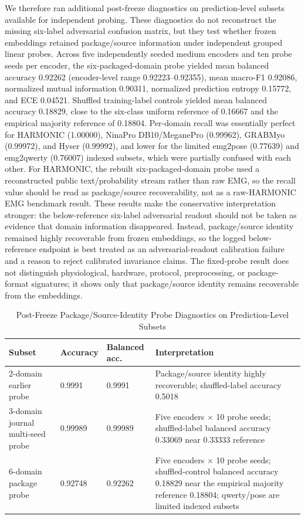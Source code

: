 \documentclass[journal]{IEEEtran}
\begin{document}
We therefore ran additional post-freeze diagnostics on prediction-level subsets available for independent probing. These diagnostics do not reconstruct the missing six-label adversarial confusion matrix, but they test whether frozen embeddings retained package/source information under independent grouped linear probes. Across five independently seeded medium encoders and ten probe seeds per encoder, the six-packaged-domain probe yielded mean balanced accuracy 0.92262 (encoder-level range 0.92223--0.92355), mean macro-F1 0.92086, normalized mutual information 0.90311, normalized prediction entropy 0.15772, and ECE 0.04521. Shuffled training-label controls yielded mean balanced accuracy 0.18829, close to the six-class uniform reference of 0.16667 and the empirical majority reference of 0.18804. Per-domain recall was essentially perfect for HARMONIC (1.00000), NinaPro DB10/MeganePro (0.99962), GRABMyo (0.99972), and Hyser (0.99992), and lower for the limited emg2pose (0.77639) and emg2qwerty (0.76007) indexed subsets, which were partially confused with each other. For HARMONIC, the rebuilt six-packaged-domain probe used a reconstructed public text/probability stream rather than raw EMG, so the recall value should be read as package/source recoverability, not as a raw-HARMONIC EMG benchmark result. These results make the conservative interpretation stronger: the below-reference six-label adversarial readout should not be taken as evidence that domain information disappeared. Instead, package/source identity remained highly recoverable from frozen embeddings, so the logged below-reference endpoint is best treated as an adversarial-readout calibration failure and a reason to reject calibrated invariance claims. The fixed-probe result does not distinguish physiological, hardware, protocol, preprocessing, or package-format signatures; it shows only that package/source identity remains recoverable from the embeddings.

\begin{table}[t]
\caption{Post-Freeze Package/Source-Identity Probe Diagnostics on Prediction-Level Subsets}
\label{tab:posthocdomainprobe}
\centering
\footnotesize
\begin{tabularx}{\columnwidth}{@{}p{2.15cm}p{1.50cm}p{1.55cm}Y@{}}
\toprule
Subset & Accuracy & Balanced acc. & Interpretation \\
-domain earlier probe & 0.9991 & 0.9991 & Package/source identity highly recoverable; shuffled-label accuracy 0.5018 \\
3-domain journal multi-seed probe & 0.99989 & 0.99989 & Five encoders $\times$ 10 probe seeds; shuffled-label balanced accuracy 0.33069 near 0.33333 reference \\
6-domain package probe & 0.92748 & 0.92262 & Five encoders $\times$ 10 probe seeds; shuffled-control balanced accuracy 0.18829 near the empirical majority reference 0.18804; qwerty/pose are limited indexed subsets \\
\bottomrule
\end{tabularx}
\end{table}
\end{document}

